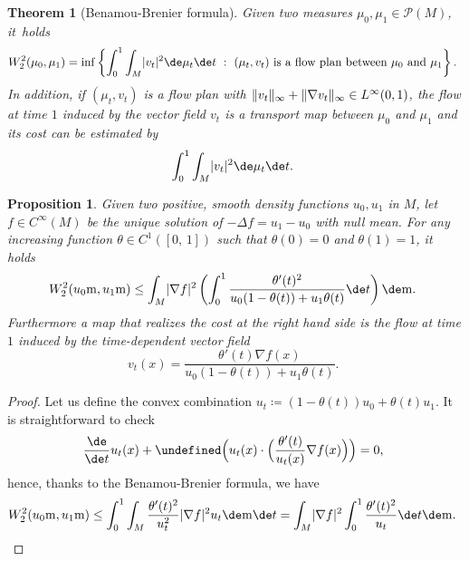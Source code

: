 \documentclass[JEP,XML,SOM,Unicode]{cedram}
\newcounter{results}[section]
\theoremstyle{plain}
\newtheorem{theorem}[results]{Theorem}
\newtheorem{proposition}[results]{Proposition}
\theoremstyle{definition}
\numberwithin{equation}{section}
\newcommand{\defeq}{\ensuremath{\coloneqq}}
\newcommand{\lapl}{\ensuremath{\Delta}}
\newcommand{\prob}{\ensuremath{\mathcal{P}}}
\newcommand{\cc}[2]{\ensuremath{\left[#1,\,#2\right]}}
\renewcommand{\comma}{\ensuremath{\text{, }}}
\newcommand{\comma}{\ensuremath{\text{, }}}
\newcommand{\fullstop}{\ensuremath{\text{. }}}
\newcommand{\st}{\ensuremath{\ :\ }}
\newcommand{\m}{\ensuremath{\mathrm m}}
\let\div\undefined
\DeclareMathOperator{\div}{div}
\DeclarePairedDelimiter\abs{\lvert}{\rvert}
\DeclarePairedDelimiter\norm{\lVert}{\rVert}
\begin{document}
\begin{theorem}[Benamou-Brenier formula]
Given two measures $\mu_0,\mu_1\in\prob(M)$, it~holds
\begin{equation*}
W_2^2(\mu_0, \mu_1) =
\inf\left\{\int_0^1\int_M \abs{v_t}^2\de\mu_t \de t\st (\mu_t, v_t)\text{ is a flow plan
between $\mu_0$ and $\mu_1$}\right\}\fullstop
\end{equation*}
In addition, if $(\mu_t, v_t)$ is a flow plan with $\norm{v_t}_\infty+\norm{\nabla v_t}_\infty\in L^\infty(0,1)$, the flow at time $1$ induced by the vector
field $v_t$ is a transport map between $\mu_0$ and $\mu_1$ and its cost can be estimated by
\begin{equation*}
\int_0^1\int_M \abs{v_t}^2\de\mu_t \de t\fullstop
\end{equation*}
\end{theorem}

\begin{proposition}\label{prop:transport_bound}
Given two positive, smooth density functions $u_0, u_1$ in $M$, let $f\in C^\infty(M)$ be the unique solution
of $-\lapl f = u_1-u_0$ with null mean.
For any increasing function $\theta\in C^1(\cc01)$ such that $\theta(0)=0$ and $\theta(1)=1$, it holds
\begin{equation*}
W_2^2(u_0\m, u_1\m)
\le \int_M\abs{\nabla f}^2
\left(\int_0^1\frac{\theta'(t)^2}{u_0(1-\theta(t))+u_1\theta(t)}\de t\right)
\de\m \fullstop
\end{equation*}
Furthermore a map that realizes the cost at the right hand side is the flow at time $1$ induced
by the time-dependent vector field
\begin{equation*}
v_t(x) = \frac{\theta'(t)\nabla f(x)}{u_0(1-\theta(t))+u_1\theta(t)} \fullstop
\end{equation*}
\end{proposition}
\begin{proof}
Let us define the convex combination $u_t\defeq (1-\theta(t))u_0+\theta(t)u_1$.
It is straightforward to check
\begin{equation*}
\frac{\de}{\de t}u_t(x)
+ \div\Bigl(u_t(x)\cdot\Bigl(\frac{\theta'(t)}{u_t(x)}\nabla f(x)\Bigr)\Bigr) = 0 \comma
\end{equation*}
hence, thanks to the Benamou-Brenier formula, we have
\begin{equation*}
W_2^2(u_0\m, u_1\m)\le
\int_0^1 \int_M \frac{\theta'(t)^2}{u_t^2}\abs{\nabla f}^2 u_t\de\m\de t
= \int_M\abs{\nabla f}^2\int_0^1\frac{\theta'(t)^2}{u_t}\de t\de\m \fullstop\qedhere
\end{equation*}
\end{proof}
\end{document}
